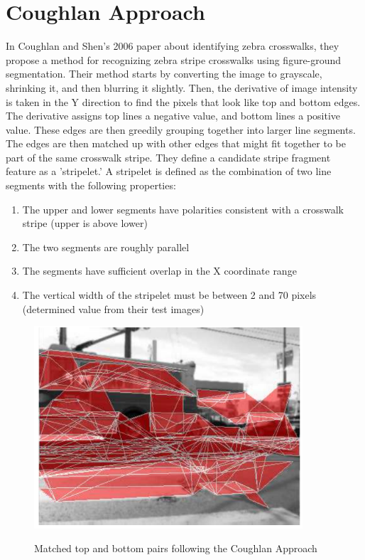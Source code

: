 \documentclass[12pt]{ucthesis}
\newcommand{\captionfonts}{\small\bf\ssp}
\begin{document}
\section{Coughlan Approach}
In Coughlan and Shen's 2006 paper \cite{Coughlan2006} about identifying zebra crosswalks, they propose a method for recognizing zebra stripe crosswalks using figure-ground segmentation.  Their method starts by converting the image to grayscale, shrinking it, and then blurring it slightly. Then, the derivative of image intensity is taken in the Y direction to find the pixels that look like top and bottom edges. The derivative assigns top lines a negative value, and bottom lines a positive value.  These edges are then greedily grouping together into larger line segments. The edges are then matched up with other edges that might fit together to be part of the same crosswalk stripe. They define a candidate stripe fragment feature as a 'stripelet.' A stripelet is defined as the combination of two line segments with the following properties: 
\begin{enumerate}
  \item The upper and lower segments have polarities consistent with a crosswalk stripe (upper is above lower)
  \item The two segments are roughly parallel
  \item The segments have sufficient overlap in the X coordinate range
  \item The vertical width of the stripelet must be between 2 and 70 pixels (determined value from their test images)
\end{enumerate}

\begin{figure}[h!]
\begin{center}
\includegraphics[width=10cm]{CoughlanStriplets.png}
\captionfonts
\caption[Coughlan Approach Stripelets]{Matched top and bottom pairs following the Coughlan Approach \cite{Coughlan2006}}
\label{fig:CoughlanStriplets}
\end{center}
\end{figure}
\end{document}
